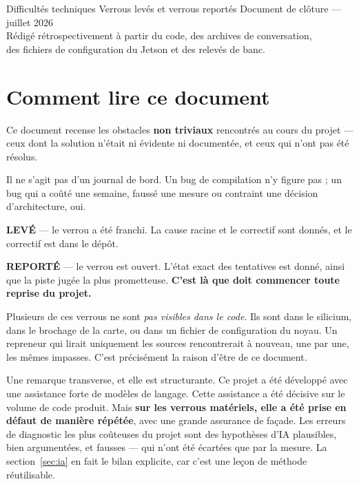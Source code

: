 \documentclass[11pt,a4paper]{article}
\begin{document}
\vespatitlepage
  {Difficultés techniques}
  {Verrous levés et verrous reportés}
  {Document de clôture — juillet 2026\\
   Rédigé rétrospectivement à partir du code, des archives de conversation,\\
   des fichiers de configuration du Jetson et des relevés de banc.}

\tableofcontents
\newpage

\section{Comment lire ce document}

Ce document recense les obstacles \textbf{non triviaux} rencontrés au cours du projet
\vespa{} — ceux dont la solution n'était ni évidente ni documentée, et ceux qui n'ont pas
été résolus.

Il ne s'agit pas d'un journal de bord. Un bug de compilation n'y figure pas ; un bug qui a
coûté une semaine, faussé une mesure ou contraint une décision d'architecture, oui.

\begin{note}[Convention]
\textbf{\textcolor{vespagreen}{LEVÉ}} — le verrou a été franchi. La cause racine et le
correctif sont donnés, et le correctif est dans le dépôt.

\textbf{\textcolor{vespared}{REPORTÉ}} — le verrou est ouvert. L'état exact des tentatives
est donné, ainsi que la piste jugée la plus prometteuse. \textbf{C'est là que doit
commencer toute reprise du projet.}
\end{note}

\begin{avertissement}
Plusieurs de ces verrous ne sont \emph{pas visibles dans le code}. Ils sont dans le
silicium, dans le brochage de la carte, ou dans un fichier de configuration du noyau.
Un repreneur qui lirait uniquement les sources rencontrerait à nouveau, une par une,
les mêmes impasses. C'est précisément la raison d'être de ce document.
\end{avertissement}

Une remarque transverse, et elle est structurante. Ce projet a été développé avec une
assistance forte de modèles de langage. Cette assistance a été décisive sur le volume de
code produit. Mais \textbf{sur les verrous matériels, elle a été prise en défaut de manière
répétée}, avec une grande assurance de façade. Les erreurs de diagnostic les plus coûteuses
du projet sont des hypothèses d'IA plausibles, bien argumentées, et fausses — qui n'ont été
écartées que par la mesure. La section~\ref{sec:ia} en fait le bilan explicite, car c'est
une leçon de méthode réutilisable.
\end{document}
